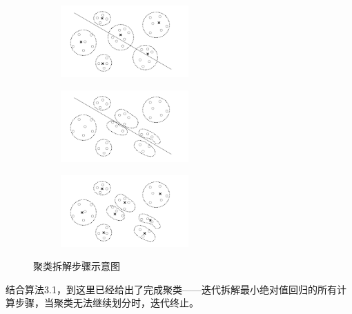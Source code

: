 \begin{figure}[H]
    \centering
    \begin{subfigure}[t]{0.3\textwidth}\label{aid-demo1}
    \includegraphics[width=4.9cm]{pics/chapter2/aid-demo-a.pdf}
    \end{subfigure}
    \begin{subfigure}[t]{0.3\textwidth}\label{aid-demo2}
    \includegraphics[width=4.9cm]{pics/chapter2/aid-demo-b.pdf}
    \end{subfigure}
    \begin{subfigure}[t]{0.3\textwidth}\label{aid-demo3}
    \includegraphics[width=4.9cm]{pics/chapter2/aid-demo-c.pdf}
    \end{subfigure}
    \caption{\small 聚类拆解步骤示意图}
    \label{aid-demo}

\end{figure}

结合算法3.1，到这里已经给出了完成聚类——迭代拆解最小绝对值回归的所有计算步骤，当聚类无法继续划分时，迭代终止。

